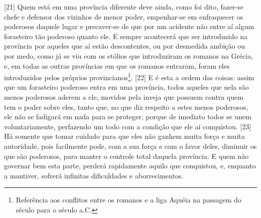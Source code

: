 {[}21{]} Quem está em uma província diferente deve ainda, como foi dito,
fazer-se chefe e defensor dos vizinhos de menor poder, empenhar-se em
enfraquecer os poderosos daquele lugar e precaver-se de que por um
acidente não entre aí algum forasteiro tão poderoso quanto ele. E sempre
acontecerá que ser introduzido na província por aqueles que aí estão
descontentes, ou por desmedida ambição ou por medo, como já se viu com
os etólios que introduziram os romanos na Grécia, e, em todas as outras
províncias em que os romanos entraram, foram eles introduzidos pelos
próprios provincianos\footnote{Referência aos conflitos entre os romanos
  e a liga Aquéia na passagem do século  para o século  a.C.}.
{[}22{]} E é esta a ordem das coisas: assim que um forasteiro poderoso
entra em uma província, todos aqueles que nela são menos poderosos
aderem a ele, movidos pela inveja que possuem contra quem tem o poder
sobre eles, tanto que, no que diz respeito a estes menos poderosos, ele
não se fadigará em nada para se proteger, porque de imediato todos se
unem voluntariamente, perfazendo um todo com a condição que ele aí
conquistou. {[}23{]} Há somente que tomar cuidado para que eles não
ganhem muita força e muita autoridade, pois facilmente pode, com a sua
força e com o favor deles, diminuir os que são poderosos, para manter o
controle total daquela província. E quem não governar bem esta parte,
perderá rapidamente aquilo que conquistou, e, enquanto a mantiver,
sofrerá infinitas dificuldades e aborrecimentos.

